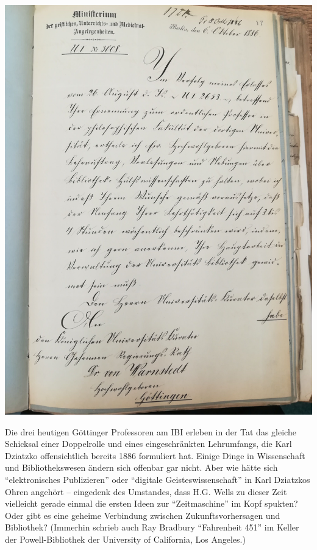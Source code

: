 \documentclass[a4paper,
fontsize=11pt,
oneside,
numbers=noperiodatend,
parskip=half-,
bibliography=totoc,
final
]{scrartcl}
\begin{document}
\begin{center}
\includegraphics{img/image2.jpg}
\end{center}

Die drei heutigen Göttinger Professoren am IBI erleben in der Tat das
gleiche Schicksal einer Doppelrolle und eines eingeschränkten
Lehrumfangs, die Karl Dziatzko offensichtlich bereits 1886 formuliert
hat. Einige Dinge in Wissenschaft und Bibliothekswesen ändern sich
offenbar gar nicht. Aber wie hätte sich \enquote{elektronisches
Publizieren} oder \enquote{digitale Geisteswissenschaft} in Karl
Dziatzkos Ohren angehört -- eingedenk des Umstandes, dass H.G. Wells zu
dieser Zeit vielleicht gerade einmal die ersten Ideen zur
\enquote{Zeitmaschine} im Kopf spukten? Oder gibt es eine geheime
Verbindung zwischen Zukunftsvorhersagen und Bibliothek? (Immerhin
schrieb auch Ray Bradbury \enquote{Fahrenheit 451} im Keller der
Powell-Bibliothek der University of California, Los Angeles.)
\end{document}
